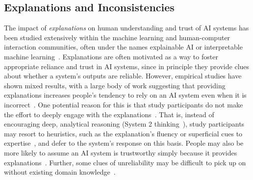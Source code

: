\subsection{Explanations and Inconsistencies}
\label{sec:llmresponses}


The impact of \emph{explanations} on human understanding and trust of AI systems has been studied extensively within the machine learning and human-computer interaction communities, often under the names explainable AI or interpretable machine learning~\cite{liao2021human,vaughan2021humancentered,arrieta2019explainable,RudinEtAlSurvey2022,Kim2023CHI}. Explanations are often motivated as a way to foster appropriate reliance and trust in AI systems, since in principle they provide clues about whether a system's outputs are reliable. However, empirical studies have shown mixed results, with a large body of work suggesting that providing explanations increases people's tendency to rely on an AI system even when it is incorrect~\cite{zhang2020effect,Bansal2021CHI,Poursabzi-Sangdeh-CHI2021,wang2021explanations}. One potential reason for this is that study participants do not make the effort to deeply engage with the explanations~\cite{kaur2020CHI,buccinca2020proxy,gajos2022people,liao2022designing,Vasconcelos2023CSCW}. That is, instead of encouraging deep, analytical reasoning (System 2 thinking~\cite{Kahneman2003,kahneman2011thinking}), study participants may resort to heuristics, such as the explanation's fluency or superficial cues to expertise~\cite{trout2008}, and defer to the system's response on this basis. People may also be more likely to assume an AI system is trustworthy simply because it provides explanations~\cite{ehsan2021explainable}. Further, some clues of unreliability may be difficult to pick up on without existing domain knowledge~\cite{chen2023understanding}.



